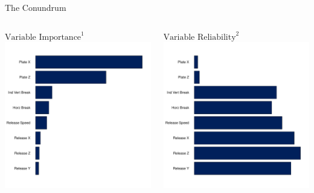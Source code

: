 \documentclass{beamer}
\begin{document}
  \begin{frame}{The Conundrum}
    \begin{columns}
      \begin{column}{0.5\textwidth}
        \centering
        $\mbox{Variable Importance}^1$\\
        \includegraphics[width = \textwidth]{images/feature_importance.pdf}
      \end{column}
      \begin{column}{0.5\textwidth}
        \centering
        $\mbox{Variable Reliability}^2$\\
        \includegraphics[width = \textwidth]{images/feature_reliability.pdf}

\end{column}
\end{columns}
\end{frame}
\end{document}
